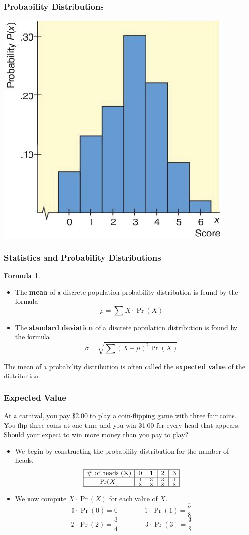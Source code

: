 \documentclass{beamer}
\theoremstyle{definition}
\newtheorem{formula}{Formula}
\begin{document}
\begin{frame}
\frametitle{Probability Distributions}\pause
\centerline{\includegraphics[width=3 in]{Image1.jpg}}
\end{frame}

\begin{frame}
\frametitle{Statistics and Probability Distributions}\pause
\begin{formula}
\begin{itemize}
\item The \textbf{mean} of a discrete population probability distribution is found by the formula
$$\mu=\sum X\cdot\Pr(X)$$\pause
\item The \textbf{standard deviation} of a discrete population distribution is found by the formula
$$\sigma=\sqrt{\sum(X-\mu)^2\Pr(X)}$$
\end{itemize}
\end{formula}\pause
\begin{definition}
The mean of a probability distribution is often called the \textbf{expected value} of the distribution.
\end{definition}
\end{frame}

\begin{frame}
\frametitle{Expected Value}\pause
\vspace*{-.15in}
\begin{example}
At a carnival, you pay \$2.00 to play a coin-flipping game with three fair coins.  You flip three coins at one time and you win \$1.00 for every head that appears.  Should your expect to win more money than you pay to play?
\end{example}\pause
\begin{itemize}
\item We begin by constructing the probability distribution for the number of heads.\pause
$$\begin{array}{|c|c|c|c|c|}
\hline
\text{\# of heads (X)}&0&1&2&3\\
\hline
\Pr(X)&\frac{1}{8}&\frac{3}{8}&\frac{3}{8}&\frac{1}{8}\\
\hline
\end{array}$$\pause
\item We now compute $X\cdot\Pr(X)$ for each value of $X$.\pause
$$0\cdot\Pr(0)=0\qquad\qquad 1\cdot\Pr(1)=\frac{3}{8}$$
$$2\cdot\Pr(2)=\frac{3}{4}\qquad\qquad 3\cdot\Pr(3)=\frac{3}{8}$$
\end{itemize}
\end{frame}
\end{document}
